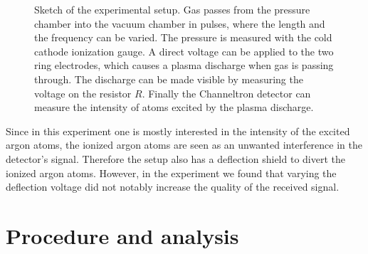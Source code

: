 \documentclass[a4paper,10pt]{article}
\begin{document}
\begin{figure}[H]
\caption{Sketch of the experimental setup. Gas passes from the pressure chamber into the vacuum chamber in pulses, where the length and the frequency can be varied. The pressure is measured with the cold cathode ionization gauge. A direct voltage can be applied to the two ring electrodes, which causes a plasma discharge when gas is passing through. The discharge can be made visible by measuring the voltage on the resistor $R$. Finally the Channeltron detector can measure the intensity of atoms excited by the plasma discharge. }
\label{fig_setup}
\end{figure}
Since in this experiment one is mostly interested in the intensity of the excited argon atoms, the ionized argon atoms are seen as an unwanted interference in the detector's signal. Therefore the setup also has a deflection shield to divert the ionized argon atoms. However, in the experiment we found that varying the deflection voltage did not notably increase the quality of the received signal.

\section{Procedure and analysis}
\end{document}

